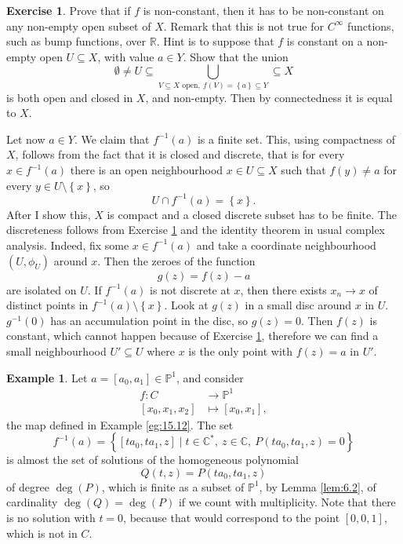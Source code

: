 \documentclass{article}
\newcommand{\R}{\mathbb{R}}
\newcommand{\C}{\mathbb{C}}
\renewcommand{\P}{\mathbb{P}}
\newcommand{\rb}[1]{\left( #1 \right)}
\renewcommand{\sb}[1]{\left[ #1 \right]}
\newcommand{\cb}[1]{\left\{ #1 \right\}}
\theoremstyle{definition}\newtheorem{definition}{Definition}[section]
\theoremstyle{definition}\newtheorem{notation}[definition]{Notation}
\theoremstyle{definition}\newtheorem{remark}[definition]{Remark}
\theoremstyle{definition}\newtheorem{example1}[definition]{Example}
\theoremstyle{definition}\newtheorem{fact}{Fact}
\theoremstyle{definition}\newtheorem{exercise}{Exercise}
\theoremstyle{definition}\newtheorem*{example2}{Example}
\begin{document}
\begin{exercise}
\label{ex:48}
Prove that if $ f $ is non-constant, then it has to be non-constant on any non-empty open subset of $ X $. Remark that this is not true for $ C^\infty $ functions, such as bump functions, over $ \R $. Hint is to suppose that $ f $ is constant on a non-empty open $ U \subseteq X $, with value $ a \in Y $. Show that the union
$$ \emptyset \ne U \subseteq \bigcup_{V \subseteq X \text{ open}, \ f\rb{V} = \cb{a} \subseteq Y} \subseteq X $$
is both open and closed in $ X $, and non-empty. Then by connectedness it is equal to $ X $.
\end{exercise}

Let now $ a \in Y $. We claim that $ f^{-1}\rb{a} $ is a finite set. This, using compactness of $ X $, follows from the fact that it is closed and discrete, that is for every $ x \in f^{-1}\rb{a} $ there is an open neighbourhood $ x \in U \subseteq X $ such that $ f\rb{y} \ne a $ for every $ y \in U \setminus \cb{x} $, so
$$ U \cap f^{-1}\rb{a} = \cb{x}. $$
After I show this, $ X $ is compact and a closed discrete subset has to be finite. The discreteness follows from Exercise \ref{ex:48} and the identity theorem in usual complex analysis. Indeed, fix some $ x \in f^{-1}\rb{a} $ and take a coordinate neighbourhood $ \rb{U, \phi_U} $ around $ x $. Then the zeroes of the function
$$ g\rb{z} = f\rb{z} - a $$
are isolated on $ U $. If $ f^{-1}\rb{a} $ is not discrete at $ x $, then there exists $ x_n \to x $ of distinct points in $ f^{-1}\rb{a} \setminus \cb{x} $. Look at $ g\rb{z} $ in a small disc around $ x $ in $ U $. $ g^{-1}\rb{0} $ has an accumulation point in the disc, so $ g\rb{z} = 0 $. Then $ f\rb{z} $ is constant, which cannot happen because of Exercise \ref{ex:48}, therefore we can find a small neighbourhood $ U' \subseteq U $ where $ x $ is the only point with $ f\rb{z} = a $ in $ U' $.

\begin{example1}
Let $ a = \sb{a_0, a_1} \in \P^1 $, and consider
\begin{align*}
f : C & \to \P^1 \\
\sb{x_0, x_1, x_2} & \mapsto \sb{x_0, x_1},
\end{align*}
the map defined in Example \ref{eg:15.12}. The set
$$ f^{-1}\rb{a} = \cb{\sb{ta_0, ta_1, z} \mid t \in \C^*, \ z \in \C, \ P\rb{ta_0, ta_1, z} = 0} $$
is almost the set of solutions of the homogeneous polynomial
$$ Q\rb{t, z} = P\rb{ta_0, ta_1, z} $$
of degree $ \deg\rb{P} $, which is finite as a subset of $ \P^1 $, by Lemma \ref{lem:6.2}, of cardinality $ \deg\rb{Q} = \deg\rb{P} $ if we count with multiplicity. Note that there is no solution with $ t = 0 $, because that would correspond to the point $ \sb{0, 0, 1} $, which is not in $ C $.
\end{example1}
\end{document}
